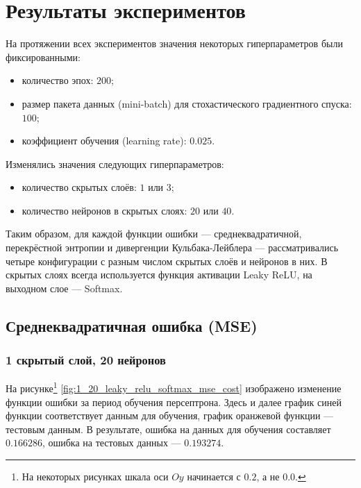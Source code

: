 \documentclass[a4paper, 14pt]{extarticle}
\begin{document}
\section{Результаты экспериментов}

На протяжении всех экспериментов значения некоторых гиперпараметров были фиксированными:
\begin{itemize}
  \item количество эпох: $200$;
  \item размер пакета данных (mini-batch) для стохастического градиентного спуска: $100$;
  \item коэффициент обучения (learning rate): $0.025$.
\end{itemize}
Изменялись значения следующих гиперпараметров:
\begin{itemize}
  \item количество скрытых слоёв: $1$ или $3$;
  \item количество нейронов в скрытых слоях: $20$ или $40$.
\end{itemize}
Таким образом, для каждой функции ошибки --- среднеквадратичной, перекрёстной энтропии и дивергенции Кульбака-Лейблера --- рассматривались четыре
конфигурации с разным числом скрытых слоёв и нейронов в них. В скрытых слоях всегда используется функция активации Leaky ReLU, на выходном слое ---
Softmax.

\subsection{Среднеквадратичная ошибка (MSE)}

\subsubsection{1 скрытый слой, 20 нейронов}


На рисунке\footnote{На некоторых рисунках шкала оси $Oy$ начинается с $0.2$, а не $0.0$.} \ref{fig:1_20_leaky_relu_softmax_mse_cost} изображено
изменение функции ошибки за период обучения персептрона. Здесь и далее график синей функции соответствует данным для обучения, график оранжевой
функции --- тестовым данным. В результате, ошибка на данных для обучения составляет $0.166286$, ошибка на тестовых данных --- $0.193274$.
\end{document}
